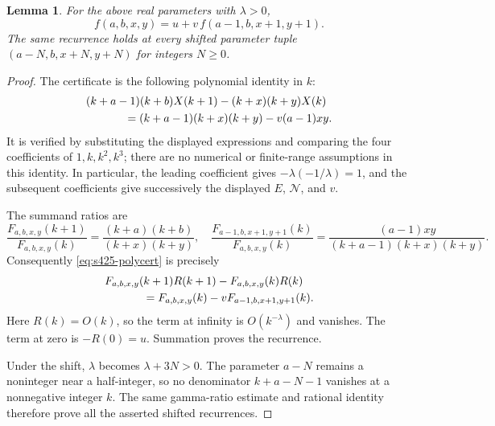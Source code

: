\documentclass[11pt,a4paper]{article}
\newtheorem{lemma}[theorem]{Lemma}
\theoremstyle{remark}\newtheorem{remark}[theorem]{Remark}
\numberwithin{equation}{section}
\begin{document}
\begin{lemma}\label{lem:s425-recurrence}
For the above real parameters with $\lambda>0$,
\[
 f(a,b,x,y)=u+v\,f(a-1,b,x+1,y+1).
\]
The same recurrence holds at every shifted parameter tuple
$(a-N,b,x+N,y+N)$ for integers $N\ge0$.
\end{lemma}
\begin{proof}
The certificate is the following polynomial identity in $k$:
\begin{equation}\label{eq:s425-polycert}
\begin{split}
 &(k+a-1)(k+b)X(k+1)-(k+x)(k+y)X(k)\\
 &\hspace{12mm}=(k+a-1)(k+x)(k+y)-v(a-1)xy.
\end{split}
\end{equation}
It is verified by substituting the displayed expressions and comparing
the four coefficients of $1,k,k^2,k^3$; there are no numerical
or finite-range assumptions in this identity. In particular, the leading
coefficient gives $-\lambda(-1/\lambda)=1$, and the subsequent
coefficients give successively the displayed $E$, $\mathcal N$, and $v$.

The summand ratios are
\[
 \frac{F_{a,b,x,y}(k+1)}{F_{a,b,x,y}(k)}
  =\frac{(k+a)(k+b)}{(k+x)(k+y)},
 \quad
 \frac{F_{a-1,b,x+1,y+1}(k)}{F_{a,b,x,y}(k)}
  =\frac{(a-1)xy}{(k+a-1)(k+x)(k+y)}.
\]
Consequently \eqref{eq:s425-polycert} is precisely
\begin{equation}\label{eq:s425-telescope}
\begin{split}
 &F_{a,b,x,y}(k+1)R(k+1)-F_{a,b,x,y}(k)R(k)\\
 &\hspace{12mm}=F_{a,b,x,y}(k)
       -vF_{a-1,b,x+1,y+1}(k).
\end{split}
\end{equation}
Here $R(k)=O(k)$, so the term at infinity is
$O(k^{-\lambda})$ and vanishes. The term at zero is
$-R(0)=u$. Summation proves the recurrence.

Under the shift, $\lambda$ becomes $\lambda+3N>0$.
The parameter $a-N$ remains a noninteger near a half-integer,
so no denominator $k+a-N-1$ vanishes at a nonnegative integer $k$.
The same gamma-ratio estimate and rational identity therefore prove
all the asserted shifted recurrences.
\end{proof}
\end{document}
